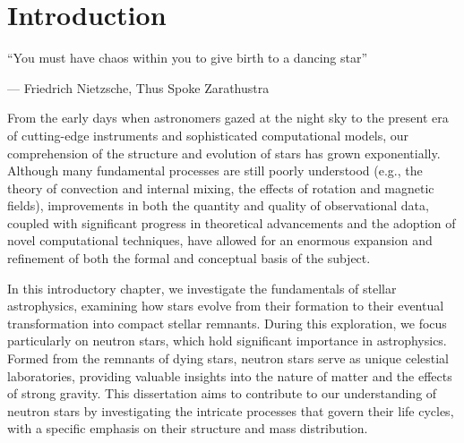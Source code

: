 \documentclass[main.tex]{subfiles}
\begin{document}
    \chapter{Introduction}
    \setlength{\epigraphwidth}{0.8\textwidth}
        \epigraph{
            ``You must have chaos within you to give birth to a dancing star''
    }{--- Friedrich Nietzsche, Thus Spoke Zarathustra}

    From the early days when astronomers gazed at the night sky to the present era of cutting-edge instruments and sophisticated computational models, our comprehension of the structure and evolution of stars has grown exponentially. Although many fundamental processes are still poorly understood (e.g., the theory of convection and internal mixing, the effects of rotation and magnetic fields), improvements in both the quantity and quality of observational data, coupled with significant progress in theoretical advancements and the adoption of novel computational techniques, have allowed for an enormous expansion and refinement of both the formal and conceptual basis of the subject.

    
    In this introductory chapter, we investigate the fundamentals of stellar astrophysics, examining how stars evolve from their formation to their eventual transformation into compact stellar remnants. During this exploration, we focus particularly on neutron stars, which hold significant importance in astrophysics. Formed from the remnants of dying stars, neutron stars serve as unique celestial laboratories, providing valuable insights into the nature of matter and the effects of strong gravity. This dissertation aims to contribute to our understanding of neutron stars by investigating the intricate processes that govern their life cycles, with a specific emphasis on their structure and mass distribution.
\end{document}
